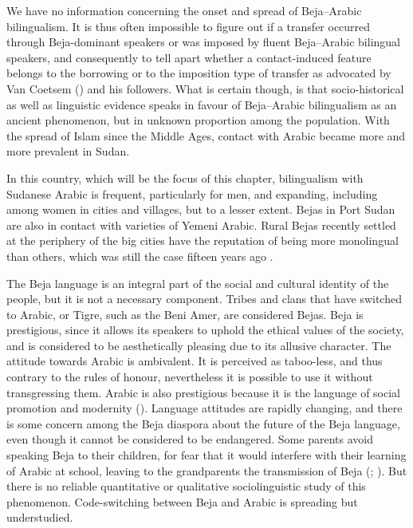 \documentclass[output=paper]{langsci/langscibook}
\begin{document}
We have no information concerning the onset and spread of Beja--Arabic bilingualism. It is thus often impossible to figure out if a transfer occurred through Beja-dominant speakers or was imposed by fluent Beja--Arabic bilingual speakers, and consequently to tell apart whether a contact-induced feature belongs to the borrowing or to the imposition type of transfer as advocated by Van Coetsem (\citeyear{VanCoetsem1988,VanCoetsem2000}) and his followers. What is certain though, is that socio-historical as well as linguistic evidence speaks in favour of Beja--Arabic bilingualism as an ancient phenomenon, but in unknown proportion among the population. With the spread of Islam since the Middle Ages, contact with Arabic became more and more prevalent in Sudan. 

In this country, which will be the focus of this chapter, bilingualism with Suda\-nese Arabic is frequent, particularly for men, and expanding, including among women in cities and villages, but to a lesser extent. Bejas in Port Sudan are also in contact with varieties of Yemeni Arabic. Rural Bejas recently settled at the periphery of the big cities have the reputation of being more monolingual than others, which was still the case fifteen years ago \citep{Vanhove2003}.

The Beja language is an integral part of the social and cultural identity of the people, but it is not a necessary component. Tribes and clans that have switched to Arabic, or Tigre, such as the Beni Amer, are considered Bejas. Beja is prestigious, since it allows its speakers to uphold the ethical values of the society, and is considered to be aesthetically pleasing due to its allusive character. The attitude towards Arabic is ambivalent. It is perceived as taboo-less, and thus contrary to the rules of honour, nevertheless it is possible to use it without transgressing them. Arabic is also prestigious because it is the language of social promotion and modernity (\citealt{HamidAhmed2005article}). Language attitudes are rapidly changing, and there is some concern among the Beja diaspora about the future of the Beja language, even though it cannot be considered to be endangered. Some parents avoid speaking Beja to their children, for fear that it would interfere with their learning of Arabic at school, leaving to the grandparents the transmission of Beja (\citealt{Wedekind2012}; \citealt{Vanhove2017}). But there is no reliable quantitative or qualitative sociolinguistic study of this phenomenon. Code-switching between Beja and Arabic is spreading but understudied.
\end{document}
